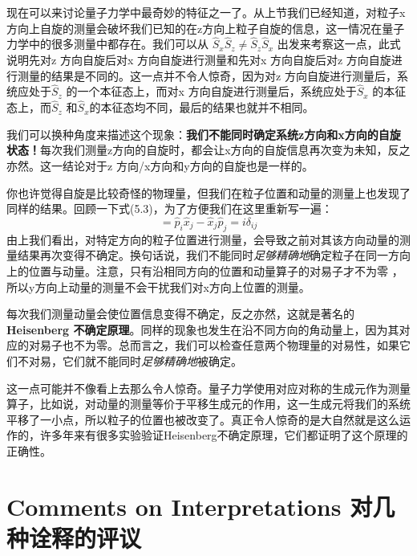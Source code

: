 现在可以来讨论量子力学中最奇妙的特征之一了。从上节我们已经知道，对粒子x方向上自旋的测量会破坏我们已知的在z方向上粒子自旋的信息，这一情况在量子力学中的很多测量中都存在。我们可以从 $\hat S_x \hat S_z \ne \hat S_z \hat S_x$ 出发来考察这一点，此式说明先对z 方向自旋后对x 方向自旋进行测量和先对x 方向自旋后对z 方向自旋进行测量的结果是不同的。这一点并不令人惊奇，因为对z 方向自旋进行测量后，系统应处于$\hat S_z$ 的一个本征态上，而对x 方向自旋进行测量后，系统应处于$\hat S_x$ 的本征态上，而$\hat S_z$ 和$\hat S_x$的本征态均不同，最后的结果也就并不相同。
\par
我们可以换种角度来描述这个现象：{\bf 我们不能同时确定系统z方向和x方向的自旋状态！}每次我们测量z方向的自旋时，都会让x方向的自旋信息再次变为未知，反之亦然。这一结论对于z 方向/x方向和y方向的自旋也是一样的。
\par
你也许觉得自旋是比较奇怪的物理量，但我们在粒子位置和动量的测量上也发现了同样的结果。回顾一下式(5.3)，为了方便我们在这里重新写一遍：
\begin{equation}
[\hat p_i,\hat x_j]=\hat p_i \hat x_j - \hat x_j \hat p_j =i \delta_{ij}
\end{equation}
由上我们看出，对特定方向的粒子位置进行测量，会导致之前对其该方向动量的测量结果再次变得不确定。换句话说，我们不能同时{\it 足够精确地}确定粒子在同一方向上的位置与动量。注意，只有沿相同方向的位置和动量算子的对易子才不为零
，所以y方向上动量的测量不会干扰我们对x方向上位置的测量。
\par
每次我们测量动量会使位置信息变得不确定，反之亦然，这就是著名的\textbf{Heisenberg 不确定原理}。同样的现象也发生在沿不同方向的角动量上，因为其对应的对易子也不为零。总而言之，我们可以检查任意两个物理量的对易性，如果它们不对易，它们就不能同时{\it 足够精确地}被确定。
\par
这一点可能并不像看上去那么令人惊奇。量子力学使用对应对称的生成元作为测量算子，比如说，对动量的测量等价于平移生成元的作用，这一生成元将我们的系统平移了一小点，所以粒子的位置也被改变了。真正令人惊奇的是大自然就是这么运作的，许多年来有很多实验验证Heisenberg不确定原理，它们都证明了这个原理的正确性。



\section[对几种诠释的评议]{Comments on Interpretations \quad 对几种诠释的评议}\label{sec8.7}

